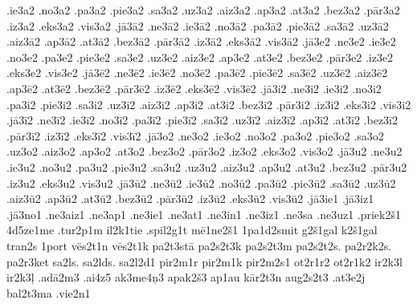 {.ie3a2
.no3a2
.pa3a2
.pie3a2
.sa3a2
.uz3a2
.aiz3a2
.ap3a2
.at3a2
.bez3a2
.pār3a2
.iz3a2
.eks3a2
.vis3a2
.jā3ā2
.ne3ā2
.ie3ā2
.no3ā2
.pa3ā2
.pie3ā2
.sa3ā2
.uz3ā2
.aiz3ā2
.ap3ā2
.at3ā2
.bez3ā2
.pār3ā2
.iz3ā2
.eks3ā2
.vis3ā2
.jā3e2
.ne3e2
.ie3e2
.no3e2
.pa3e2
.pie3e2
.sa3e2
.uz3e2
.aiz3e2
.ap3e2
.at3e2
.bez3e2
.pār3e2
.iz3e2
.eks3e2
.vis3e2
.jā3ē2
.ne3ē2
.ie3ē2
.no3ē2
.pa3ē2
.pie3ē2
.sa3ē2
.uz3ē2
.aiz3ē2
.ap3ē2
.at3ē2
.bez3ē2
.pār3ē2
.iz3ē2
.eks3ē2
.vis3ē2
.jā3i2
.ne3i2
.ie3i2
.no3i2
.pa3i2
.pie3i2
.sa3i2
.uz3i2
.aiz3i2
.ap3i2
.at3i2
.bez3i2
.pār3i2
.iz3i2
.eks3i2
.vis3i2
.jā3ī2
.ne3ī2
.ie3ī2
.no3ī2
.pa3ī2
.pie3ī2
.sa3ī2
.uz3ī2
.aiz3ī2
.ap3ī2
.at3ī2
.bez3ī2
.pār3ī2
.iz3ī2
.eks3ī2
.vis3ī2
.jā3o2
.ne3o2
.ie3o2
.no3o2
.pa3o2
.pie3o2
.sa3o2
.uz3o2
.aiz3o2
.ap3o2
.at3o2
.bez3o2
.pār3o2
.iz3o2
.eks3o2
.vis3o2
.jā3u2
.ne3u2
.ie3u2
.no3u2
.pa3u2
.pie3u2
.sa3u2
.uz3u2
.aiz3u2
.ap3u2
.at3u2
.bez3u2
.pār3u2
.iz3u2
.eks3u2
.vis3u2
.jā3ū2
.ne3ū2
.ie3ū2
.no3ū2
.pa3ū2
.pie3ū2
.sa3ū2
.uz3ū2
.aiz3ū2
.ap3ū2
.at3ū2
.bez3ū2
.pār3ū2
.iz3ū2
.eks3ū2
.vis3ū2
.jā3ie1
.jā3iz1
.jā3no1
.ne3aiz1
.ne3ap1
.ne3ie1
.ne3at1
.ne3in1
.ne3iz1
.ne3sa
.ne3uz1
.priek2š1
4d5ze1me
.tur2p1m
il2k1tie
.spil2g1t
mē1ne2š1
1pa1d2smit
g2š1gal
k2š1gal
tran2s
1port
vēs2t1n
vēs2t1k
pa2t3stā
pa2s2t3k
pa2s2t3m
pa2s2t2s.
pa2r2k2s.
pa2r3ket
sa2ls.
sa2lds.
sa2l2d1
pir2m1r
pir2m1k
pir2m2s1
ot2r1r2
ot2r1k2
ir2k3l
ir2k3ļ
.adā2m3
.ai4z5
ak3me4ņ3
apak2š3
ap1au
kār2t3n
aug2s2t3
.at3e2j
bal2t3ma
.vie2n1
}
